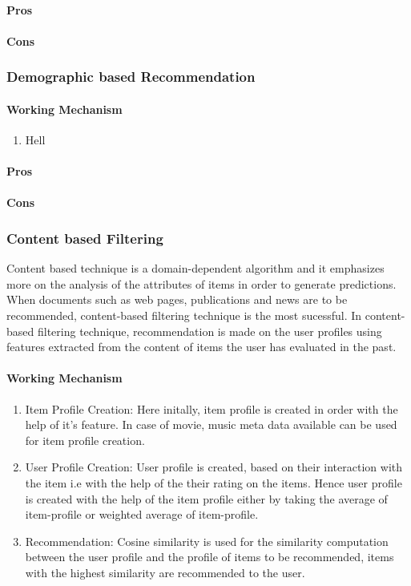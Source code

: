 \paragraph{Pros}\hfill
\paragraph{Cons}\hfill

\subsubsection{Demographic based Recommendation}
\paragraph{Working Mechanism}\hfill
\begin{enumerate}
	\item Hell
\end{enumerate}
\paragraph{Pros}\hfill
\paragraph{Cons}\hfill
\subsubsection{Content based Filtering}
Content based technique is a domain-dependent algorithm and it emphasizes more on the analysis of the attributes of items in order to generate predictions. When documents such as web pages, publications and news are to be recommended, content-based filtering technique is the most sucessful. In content-based filtering technique, recommendation is made on the user profiles using features extracted from the content of items the user has evaluated in the past. 
\paragraph{Working Mechanism}\hfill

\begin{enumerate}
	\item Item Profile Creation: Here initally, item profile is created in order with the help of it's feature. In case of movie, music meta data available can be used for item profile creation.
	\item User Profile Creation: User profile is created, based on their interaction with the item i.e with the help of the their rating on the items. Hence user profile is created with the help of the item profile either by taking the average of item-profile or weighted average of item-profile.
	\item Recommendation: Cosine similarity is used for the similarity computation between the user profile and the profile of items to be recommended, items with the highest similarity are recommended to the user. 
\end{enumerate}

